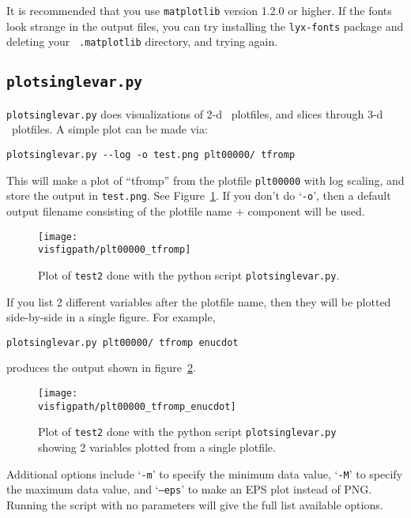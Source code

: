 It is recommended that you use {\tt matplotlib} version 1.2.0 or
higher.  If the fonts look strange in the output files, you can try
installing the {\tt lyx-fonts} package and deleting your {\tt
  .matplotlib} directory, and trying again.

\subsection{\tt plotsinglevar.py}

{\tt plotsinglevar.py} does visualizations of 2-d \boxlib\ plotfiles,
and slices through 3-d \boxlib\ plotfiles.  A simple plot can be made
via:
\begin{verbatim}
plotsinglevar.py --log -o test.png plt00000/ tfromp
\end{verbatim}
This will make a plot of ``tfromp'' from the plotfile {\tt plt00000} with log scaling,
and store the output in {\tt test.png}.  See Figure~\ref{fig:python}.
If you don't do `{\tt -o}', then a default output filename consisting of the
plotfile name + component will be used.

\begin{figure}[t]
\centering
\texttt{[image: \\visfigpath/plt00000\_tfromp]}
\caption[Basic plot of {\tt test2} done with {\tt plotsinglevar.py}]
{\label{fig:python} Plot of {\tt test2} done with the python
  script {\tt plotsinglevar.py}.}
\end{figure}

If you list 2 different variables after the plotfile name, then they
will be plotted side-by-side in a single figure.  For example, 
\begin{verbatim}
plotsinglevar.py plt00000/ tfromp enucdot
\end{verbatim}
produces the output shown in figure~\ref{fig:python_two}.

\begin{figure}[t]
\centering
\texttt{[image: \\visfigpath/plt00000\_tfromp\_enucdot]}
\caption[Plot of two variables from {\tt test2} done with {\tt plotsinglevar.py}]
{\label{fig:python_two} Plot of {\tt test2} done with the
  python script {\tt plotsinglevar.py} showing 2 variables plotted
  from a single plotfile.}
\end{figure}


Additional options include `{\tt -m}' to specify the minimum data
value, `{\tt -M}' to specify the maximum data value, and `{\tt --eps}'
to make an EPS plot instead of PNG.  Running the script with no parameters
will give the full list available options.


